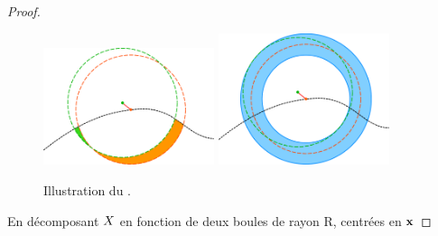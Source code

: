 \begin{proof}
%
\begin{figure}[ht]
    \begin{center}
      \includegraphics[width=5cm]{figures/momentsPerturbation}
      \includegraphics[width=5cm]{figures/momentsPerturbation2}
    \end{center}
    \caption[Illustration du .]{Illustration du .}
    \label{fig:moments-perturb}
\end{figure}
%
En décomposant $X$ en fonction de deux boules de rayon R, centrées en $\mathbf{x}$

\end{proof}

